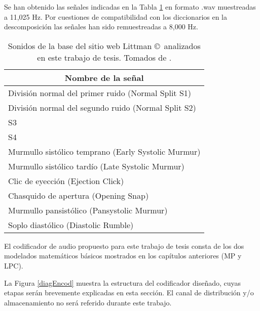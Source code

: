  Se han obtenido las señales indicadas en la Tabla \ref{wavsounds} en formato .wav muestreadas a 11,025 Hz.  Por cuestiones de compatibilidad con los diccionarios en la descomposición las señales han sido remuestreadas a 8,000 Hz.
\begin{table}[h]
\centering
\begin{tabular}{l}
\hline
\multicolumn{1}{c}{\textbf{Nombre de la señal}}     \\ \hline
División normal del primer ruido (Normal Split S1)  \\ \hline
División normal del segundo ruido (Normal Split S2) \\ \hline
S3                                                  \\ \hline
S4                                                  \\ \hline
Murmullo sistólico temprano (Early Systolic Murmur) \\ \hline
Murmullo sistólico tardío (Late Systolic Murmur)    \\ \hline
Clic de eyección (Ejection Click)                   \\ \hline
Chasquido de apertura (Opening Snap)                \\ \hline
Murmullo pansistólico (Pansystolic Murmur)          \\ \hline
Soplo diastólico (Diastolic Rumble)                 \\ \hline
\end{tabular}
\caption{Sonidos de la base del sitio web Littman \copyright~analizados en este trabajo de tesis. Tomados de \cite[]{LitmannBase}.}
\label{wavsounds}
\end{table}
 
El codificador de audio propuesto para este trabajo de tesis consta de los dos modelados matemáticos básicos mostrados en los capítulos anteriores (MP y LPC). 

La Figura \ref{diagEncod} muestra la estructura del codificador diseñado, cuyas etapas serán brevemente explicadas en esta sección. El canal de distribución y/o almacenamiento no será referido durante este trabajo.

